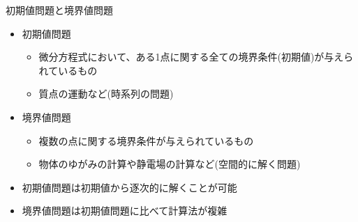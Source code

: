 \begin{frame}[t,fragile]{初期値問題と境界値問題}
  \begin{itemize}
  \item 初期値問題
    \begin{itemize}
    \item 微分方程式において、ある1点に関する全ての境界条件(初期値)が与えられているもの
    \item 質点の運動など(時系列の問題)
  \end{itemize}
  \item 境界値問題
    \begin{itemize}
    \item 複数の点に関する境界条件が与えられているもの
    \item 物体のゆがみの計算や静電場の計算など(空間的に解く問題)
  \end{itemize}
  \item 初期値問題は初期値から逐次的に解くことが可能
  \item 境界値問題は初期値問題に比べて計算法が複雑
  \end{itemize}
\end{frame}
